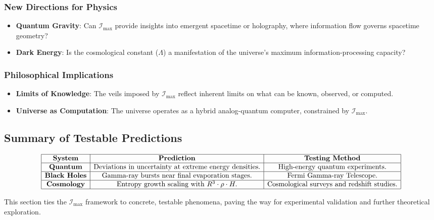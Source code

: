 \documentclass[12pt]{article}
\begin{document}
\subsubsection{New Directions for Physics}
\begin{itemize}
    \item \textbf{Quantum Gravity}: Can \( \mathcal{I}_{\text{max}} \) provide insights into emergent spacetime or holography, where information flow governs spacetime geometry?
    \item \textbf{Dark Energy}: Is the cosmological constant (\( \Lambda \)) a manifestation of the universe’s maximum information-processing capacity?
\end{itemize}

\subsubsection{Philosophical Implications}
\begin{itemize}
    \item \textbf{Limits of Knowledge}: The veils imposed by \( \mathcal{I}_{\text{max}} \) reflect inherent limits on what can be known, observed, or computed.
    \item \textbf{Universe as Computation}: The universe operates as a hybrid analog-quantum computer, constrained by \( \mathcal{I}_{\text{max}} \).
\end{itemize}

\subsection*{Summary of Testable Predictions}
\[
\begin{array}{|c|c|c|}
\hline
\textbf{System} & \textbf{Prediction} & \textbf{Testing Method} \\
\hline
\textbf{Quantum} & \text{Deviations in uncertainty at extreme energy densities.} & \text{High-energy quantum experiments.} \\
\hline
\textbf{Black Holes} & \text{Gamma-ray bursts near final evaporation stages.} & \text{Fermi Gamma-ray Telescope.} \\
\hline
\textbf{Cosmology} & \text{Entropy growth scaling with } R^3 \cdot \rho \cdot H. & \text{Cosmological surveys and redshift studies.} \\
\hline
\end{array}
\]

This section ties the \( \mathcal{I}_{\text{max}} \) framework to concrete, testable phenomena, paving the way for experimental validation and further theoretical exploration.
\end{document}
